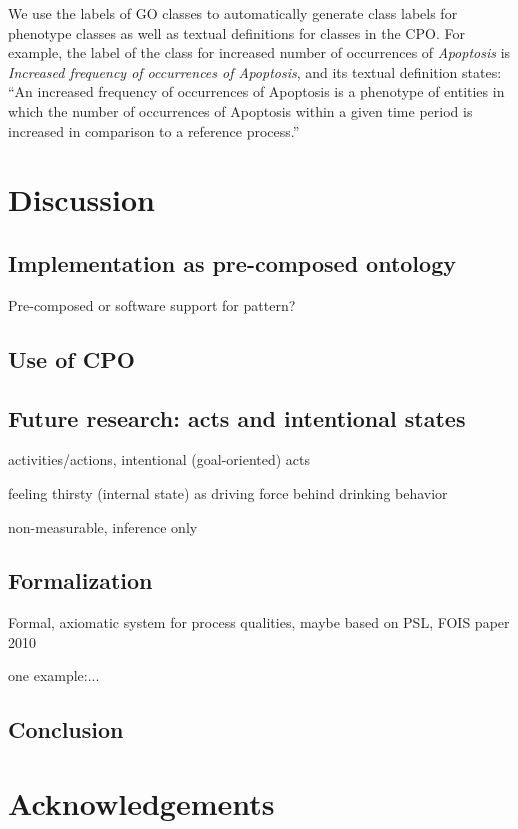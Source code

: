\documentclass{bioinfo}
\begin{document}
We use the labels of GO classes to automatically generate class labels
for phenotype classes as well as textual definitions for classes in
the CPO. For example, the label of the class for increased number of
occurrences of {\em Apoptosis} is {\em Increased frequency of
  occurrences of Apoptosis}, and its textual definition states: ``An
increased frequency of occurrences of Apoptosis is a phenotype of
entities in which the number of occurrences of Apoptosis within a
given time period is increased in comparison to a reference process.''

\section{Discussion}
\subsection{Implementation as pre-composed ontology}
Pre-composed or software support for pattern?

\subsection{Use of CPO}

\subsection{Future research: acts and intentional states}
activities/actions, intentional (goal-oriented) acts

feeling thirsty (internal state) as driving force behind drinking
behavior

non-measurable, inference only

\subsection{Formalization}
Formal, axiomatic system for process qualities, maybe based on PSL,
FOIS paper 2010

one example:...

\subsection{Conclusion}

\section{Acknowledgements}
\end{document}
